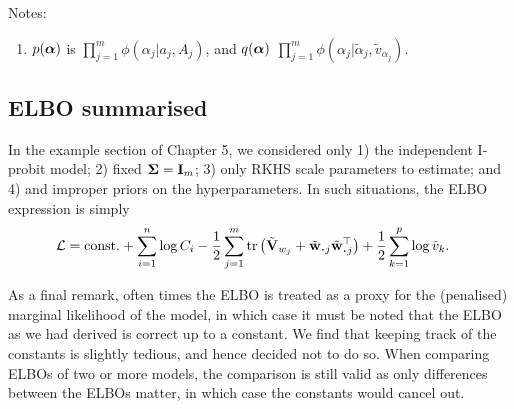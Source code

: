 Notes:
\begin{enumerate}
  \item $p({\bm\alpha})$ is $\prod_{j=1}^m \phi(\alpha_j|a_j,A_j)$, and $q({\bm\alpha})$ $\prod_{j=1}^m \phi(\alpha_j|\tilde \alpha_j,\tilde v_{\alpha_j})$.
\end{enumerate}

\subsection{ELBO summarised}

In the example section of Chapter 5, we considered  only 1) the independent I-probit model; 2) fixed ${\bm\Sigma} = {\mathbf I}_m$; 3) only RKHS scale parameters to estimate; and 4) and improper priors on the hyperparameters.
In such situations, the ELBO expression is simply
\begin{align*}
  \cL 
  &= \const + \sum_{i=1}^n  \log C_i 
  - \half \sum_{j=1}^m \tr \big(\tilde\bV_{w_j}  + \tilde\bw_{\bigcdot j}\tilde\bw_{\bigcdot j}^\top \big) + \half \sum_{k=1}^p \log \tilde v_k.
\end{align*}

As a final remark, often times the ELBO is treated as a proxy for the (penalised) marginal likelihood of the model, in which case it must be noted that the ELBO as we had derived is correct up to a constant.
We find that keeping track of the constants is slightly tedious, and hence decided not to do so.
When comparing ELBOs of two or more models, the comparison is still valid as only differences between the ELBOs matter, in which case the constants would cancel out.
